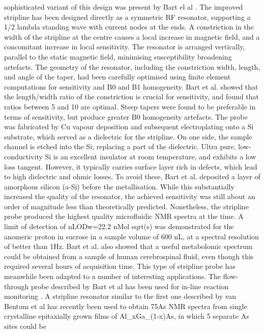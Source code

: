 sophisticated variant of this design was present by Bart el al
\cite{Bart:2009kc}. The improved stripline has been designed directly as a
symmetric RF resonator, supporting a 1/2 lambda standing wave with
current nodes at the ends. A constriction in the width of the stripline
at the centre causes a local increase in magnetic field, and a
concomitant increase in local sensitivity. The resonator is arranged
vertically, parallel to the static magnetic field, minimising
susceptibility broadening artefacts. The geometry of the resonator,
including the constriction width, length, and angle of the taper, had
been carefully optimised using finite element computations
\cite{Bart:2009er} for sensitivity and B0 and B1 homogeneity. Bart et al.
showed that the length/width ratio of the constriction is crucial for
sensitivity, and found that ratios between 5 and 10 are optimal. Steep
tapers were found to be preferable in terms of sensitivity, but produce
greater B0 homogeneity artefacts. The probe was fabricated by Cu vapour
deposition and subsequent electroplating onto a Si substrate, which
served as a dielectric for the stripline. On one side, the sample
channel is etched into the Si, replacing a part of the dielectric. Ultra
pure, low-conductivity Si is an excellent insulator at room temperature,
and exhibits a low loss tangent. However, it typically carries surface
layer rich in defects, which lead to high dielectric and ohmic losses.
To avoid these, Bart et al. deposited a layer of amorphous silicon
(a-Si) before the metallisation. While this substantially increased the
quality of the resonator, the achieved sensitivity was still about an
order of magnitude less than theoretically predicted. Nonetheless, the
stripline probe produced the highest quality microfluidic NMR spectra at
the time. A limit of detection of nLODw=22.2 nMol sqrt(s) was
demonstrated for the anomeric proton in sucrose in a sample volume of
600 nL, at a spectral resolution of better than 1Hz. Bart et al. also
showed that a useful metabolomic spectrum could be obtained from a
sample of human cerebrospinal fluid, even though this required several
hours of acquisition time. This type of stripline probe has meanwhile
been adapted to a number of interesting applications. The flow-through
probe described by Bart et al has been used for in-line reaction
monitoring \cite{Bart:2010wi}. A stripline resonator similar to the first
one described by van Bentum et al \cite{vanBentum:2008jc} has recently been
used to obtain 75As NMR spectra from single crystalline epitaxially
grown films of Al\_xGa\_(1-x)As, in which 5 separate As sites could be

